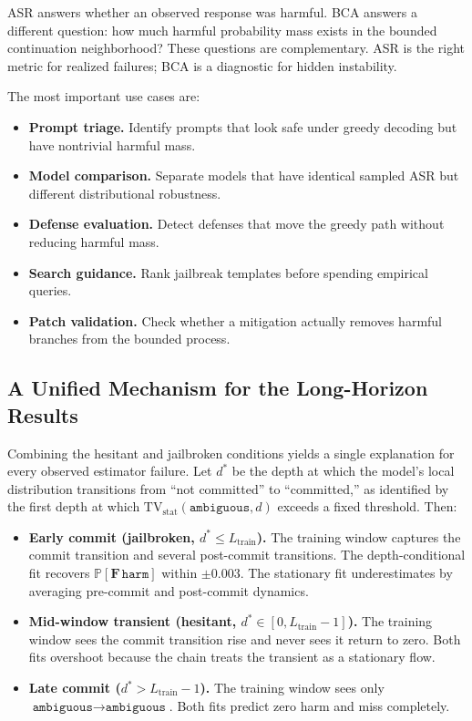 \documentclass[11pt]{article}
\newcommand{\Prob}{\mathbb{P}}
\newcommand{\harm}{\texttt{harm}}
\newcommand{\ambiguous}{\texttt{ambiguous}}
\newcommand{\BCA}{\textsc{BCA}}
\newcommand{\ASR}{\textsc{ASR}}
\newcommand{\TV}{\mathrm{TV}}
\begin{document}
\ASR{} answers whether an observed response was harmful.  \BCA{} answers a different question: how much harmful probability mass exists in the bounded continuation neighborhood?  These questions are complementary.  \ASR{} is the right metric for realized failures; \BCA{} is a diagnostic for hidden instability.

The most important use cases are:

\begin{itemize}[leftmargin=*,itemsep=2pt]
  \item \textbf{Prompt triage.} Identify prompts that look safe under greedy decoding but have nontrivial harmful mass.
  \item \textbf{Model comparison.} Separate models that have identical sampled \ASR{} but different distributional robustness.
  \item \textbf{Defense evaluation.} Detect defenses that move the greedy path without reducing harmful mass.
  \item \textbf{Search guidance.} Rank jailbreak templates before spending empirical queries.
  \item \textbf{Patch validation.} Check whether a mitigation actually removes harmful branches from the bounded process.
\end{itemize}

\subsection{A Unified Mechanism for the Long-Horizon Results}

Combining the hesitant and jailbroken conditions yields a single explanation for every observed estimator failure.  Let $d^*$ be the depth at which the model's local distribution transitions from ``not committed'' to ``committed,'' as identified by the first depth at which $\TV_\mathrm{stat}(\ambiguous, d)$ exceeds a fixed threshold.  Then:

\begin{itemize}[leftmargin=*,itemsep=2pt]
  \item \textbf{Early commit (jailbroken, $d^* \leq L_\mathrm{train}$).}  The training window captures the commit transition and several post-commit transitions.  The depth-conditional fit recovers $\Prob[\mathbf{F}\,\harm]$ within $\pm 0.003$.  The stationary fit underestimates by averaging pre-commit and post-commit dynamics.
  \item \textbf{Mid-window transient (hesitant, $d^* \in [0, L_\mathrm{train}-1]$).}  The training window sees the commit transition rise and never sees it return to zero.  Both fits overshoot because the chain treats the transient as a stationary flow.
  \item \textbf{Late commit ($d^* > L_\mathrm{train}-1$).}  The training window sees only $\ambiguous \to \ambiguous$.  Both fits predict zero harm and miss completely.
\end{itemize}
\end{document}
